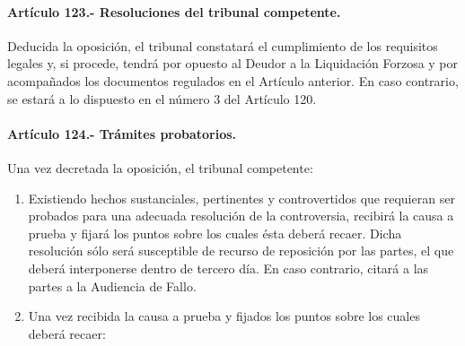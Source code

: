 \documentclass[
]{book}
\begin{document}
\hypertarget{artuxedculo-123.--resoluciones-del-tribunal-competente.}{%
\paragraph*{Artículo 123.- Resoluciones del tribunal competente.}\label{artuxedculo-123.--resoluciones-del-tribunal-competente.}}

Deducida la oposición, el tribunal constatará el cumplimiento de los requisitos legales y, si procede, tendrá por opuesto al Deudor a la Liquidación Forzosa y por acompañados los documentos regulados en el Artículo anterior. En caso contrario, se estará a lo dispuesto en el número 3 del Artículo 120.

\hypertarget{artuxedculo-124.--truxe1mites-probatorios.}{%
\paragraph*{Artículo 124.- Trámites probatorios.}\label{artuxedculo-124.--truxe1mites-probatorios.}}

Una vez decretada la oposición, el tribunal competente:

\begin{enumerate}
\def\labelenumi{\arabic{enumi})}
\item
  Existiendo hechos sustanciales, pertinentes y controvertidos que requieran ser probados para una adecuada resolución de la controversia, recibirá la causa a prueba y fijará los puntos sobre los cuales ésta deberá recaer. Dicha resolución sólo será susceptible de recurso de reposición por las partes, el que deberá interponerse dentro de tercero día. En caso contrario, citará a las partes a la Audiencia de Fallo.
\item
  Una vez recibida la causa a prueba y fijados los puntos sobre los cuales deberá recaer:
\end{enumerate}
\end{document}
